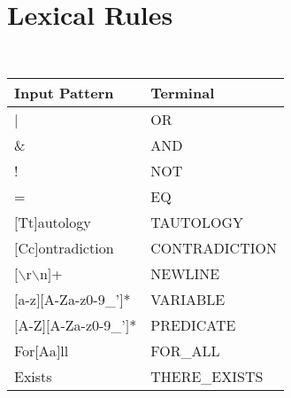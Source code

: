 \section{Lexical Rules}
	\label{sec:appendixLexer}
	{\tt
		\begin{tabular}{|l|l|}
			\hline
			\textbf{Input Pattern} & \textbf{Terminal} \\
			\hline
			|                    & OR  \\
			\&                   & AND \\
			!                    & NOT \\
			=                    & EQ  \\
			$[$Tt$]$autology     & TAUTOLOGY \\
			$[$Cc$]$ontradiction & CONTRADICTION \\
			$[\backslash$r$\backslash$n$]$+ & NEWLINE \\
			$[$a-z$][$A-Za-z0-9\_'$]$* & VARIABLE \\
			$[$A-Z$][$A-Za-z0-9\_'$]$* & PREDICATE \\
			For$[$Aa$]$ll        & FOR\_ALL \\
			Exists               & THERE\_EXISTS \\
			\hline
		\end{tabular}
	}
